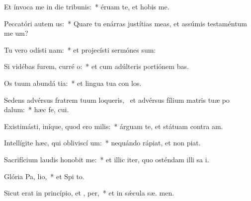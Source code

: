 \item Et ínvoca me in die tribunis:~* éruam te, et hobis me.
\item Peccatóri autem  us:~* Quare tu enárras justítias meas, et assúmis testaméntum me   um?
\item Tu vero odísti nam:~* et projecísti sermónes  sum:
\item Si vidébas furem, curré  o:~* et cum adúlteris portiónem  bas.
\item Os tuum abundá tia:~* et lingua tua con los.
\item Sedens advérsus fratrem tuum loqueris,~\pscross{} et advérsus fílium matris tuæ po dalum:~* hæc fe,  cui.
\item Existimásti, iníque, quod ero  milis:~* árguam te, et státuam contra  am.
\item Intellígite hæc, qui obliviscí um:~* nequándo rápiat, et non   piat.
\item Sacrifícium laudis honobit me:~* et illic iter, quo osténdam illi sa i.
\item Glória Pa,  lio,~* et Spi to.
\item Sicut erat in princípio, et ,  per,~* et in sǽcula sæ. men.
